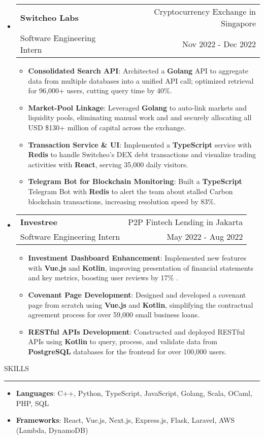 \documentclass[letterpaper, 11pt]{article}
\makeatletter
\def\sectionlineskip{\medskip}
\def\sectionskip{\medskip}
\def \entryspacing {-0pt}
\newcommand{\SectionHeading}[1]{
  \sectionskip
  \raggedright\raggedbottom\MakeUppercase{\large{#1}}
  \sectionlineskip
  \hrule
  \color{black}
}
\newcommand{\ResumeEntryTSDL}[4]{
  \vspace{-1pt}\item
    \begin{tabular*}{\textwidth}[t]{l@{\extracolsep{\fill}}r} 
      \textbf{#1} & #2 \\
      #3 & #4 \\
    \end{tabular*}\vspace{-4pt}
}
\newcommand{\ResumeItem}[2]{
  \item{
    \textbf{#1}{: #2 \vspace{-2pt}}
  }
}
\newcommand{\ResumeSubItem}[2]{\ResumeItem{#1}{#2}\vspace{-4pt}}
\newcommand{\ResumeEntryStart}{\begin{itemize}[leftmargin=2mm, label={}]}
\newcommand{\ResumeEntryEnd}{\end{itemize}\vspace{-7pt}}
\newcommand{\ResumeItemListStart}{\begin{itemize}[leftmargin=5mm, label=$\bullet$]}
\newcommand{\ResumeItemListEnd}{\end{itemize}}
\newcommand{\ProjectItemListStart}{\begin{itemize}[leftmargin=*, label=$\bullet$]}
\newcommand{\ProjectItemListEnd}{\end{itemize}\vspace{\entryspacing}}
\makeatother
\begin{document}
  \ResumeEntryStart
    \ResumeEntryTSDL{Switcheo Labs}{Cryptocurrency Exchange in Singapore}{Software Engineering Intern}{Nov 2022 - Dec 2022}
    \ResumeItemListStart
    \ResumeItem{Consolidated Search API}
      {Architected a \textbf{Golang} API to aggregate data from multiple databases into a unified API call; optimized retrieval for 96,000+ users, cutting query time by 40\%.}
    \ResumeItem{Market-Pool Linkage}
      {Leveraged \textbf{Golang} to auto-link markets and liquidity pools, eliminating manual work and and securely allocating all USD \$130+ million of capital across the exchange.}
    \ResumeItem{Transaction Service \& UI}
      {Implemented a \textbf{TypeScript} service with \textbf{Redis} to handle Switcheo's DEX debt transactions and visualize trading activities with \textbf{React}, serving 35,000 daily visitors.}
    \ResumeItem{Telegram Bot for Blockchain Monitoring}
      {Built a \textbf{TypeScript} Telegram Bot with \textbf{Redis} to alert the team about stalled Carbon blockchain transactions, increasing resolution speed by 83\%.}
    \ResumeItemListEnd
  \ResumeEntryEnd

  \ResumeEntryStart
    \ResumeEntryTSDL{Investree}{P2P Fintech Lending in Jakarta}{Software Engineering Intern}{May 2022 - Aug 2022}
    \ResumeItemListStart
      \ResumeItem{Investment Dashboard Enhancement}
      {Implemented new features with \textbf{Vue.js} and \textbf{Kotlin}, improving presentation of financial statements and key metrics, boosting user reviews by 17\%}.
      \ResumeItem{Covenant Page Development}
        {Designed and developed a covenant page from scratch using \textbf{Vue.js} and \textbf{Kotlin}, simplifying the contractual agreement process for over 59,000 small business loans.}
      \ResumeItem{RESTful APIs Development}
        {Constructed and deployed RESTful APIs using \textbf{Kotlin} to query, process, and validate data from \textbf{PostgreSQL} databases for the frontend for over 100,000 users.}
    \ResumeItemListEnd
  \ResumeEntryEnd


  \SectionHeading{Skills}
  \ResumeEntryStart
    \ResumeItem{Languages}{C++, Python, TypeScript, JavaScript, Golang, Scala, OCaml, PHP, SQL}
    \ResumeItem{Frameworks}{React, Vue.js, Next.js, Express.js, Flask, Laravel, AWS (Lambda, DynamoDB)}
  \ResumeEntryEnd
\end{document}
